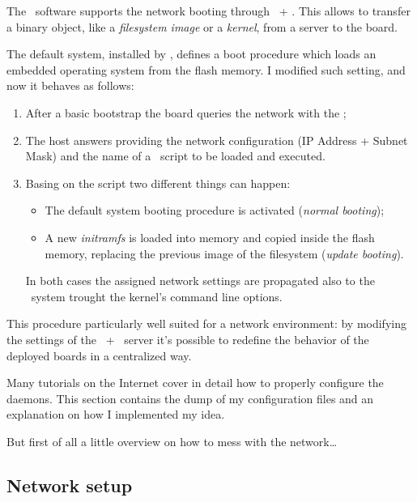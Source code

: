 The \uBoot\ software supports the network booting through \BootP\ + \TFTP.
This allows to transfer a binary object, like a \emph{filesystem image} or
a \emph{kernel}, from a server to the board.

The default system, installed by , defines a boot
procedure which loads an embedded operating system from the flash memory.
I modified such setting, and now it behaves as follows:

\begin{enumerate}

\item   After a basic bootstrap the board queries the network with the
        ;

\item   The host answers providing the network configuration (IP Address +
        Subnet Mask) and the name of a \uBoot\ script to be loaded and
        executed.

\item   Basing on the script two different things can happen:
    \begin{itemize}
    \item   The default system booting procedure is activated
            (\emph{normal booting});
    \item   A new \emph{initramfs} is loaded into memory and copied inside
            the flash memory, replacing the previous image of the
            filesystem (\emph{update booting}).
    \end{itemize}
    In both cases the assigned network settings are propagated also to the
    \Linux\ system trought the kernel's command line options.

\end{enumerate}

This procedure particularly well suited for a network environment: by
modifying the settings of the \BootP\ + \TFTP\ server it's possible to
redefine the behavior of the deployed boards in a centralized way.

Many tutorials on the Internet cover in detail how to properly configure
the daemons. This section contains the dump of my configuration files and
an explanation on how I implemented my idea.

But first of all a little overview on how to mess with the network\dots

\subsection{ Network setup }

